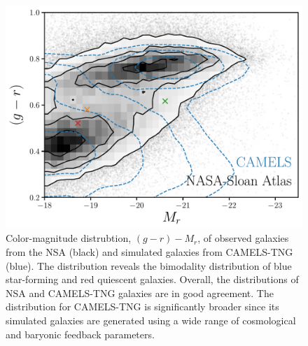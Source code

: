 \begin{figure}[ht]
\vskip 0.2in
\begin{center}
    \centerline{\includegraphics[width=\columnwidth]{figs/nsa.pdf}}
    \caption{Color-magnitude distrubtion, $(g-r) - M_r$, of observed galaxies
    from the NSA (black) and simulated galaxies from CAMELS-TNG (blue). 
    The distribution reveals the bimodality distribution of blue star-forming
    and red quiescent galaxies. 
    Overall, the distributions of NSA and CAMELS-TNG galaxies are in good
    agreement. 
    The distribution for CAMELS-TNG is significantly broader since its simulated
    galaxies are generated using a wide range of cosmological and baryonic
    feedback parameters.
    }\label{fig:nsa}
\end{center}
\vskip -0.2in
\end{figure}

